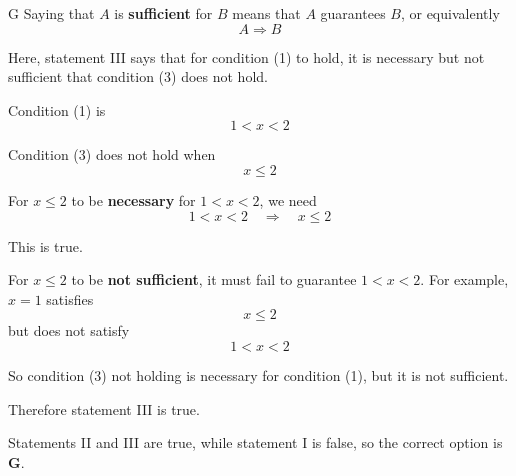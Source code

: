 \documentclass[11pt,a4paper]{article}
\begin{document}
\begin{enumerate}[label=\textbf{\arabic*.},leftmargin=*,itemsep=0pt,start=10]
\begin{djsSolution}{G}
Saying that \(A\) is \textbf{sufficient} for \(B\) means that \(A\) guarantees \(B\), or equivalently
\[
A\Longrightarrow B
\]

Here, statement III says that for condition (1) to hold, it is necessary but not sufficient that condition (3) does not hold.

Condition (1) is
\[
1<x<2
\]

Condition (3) does not hold when
\[
x\leq2
\]

For \(x\leq2\) to be \textbf{necessary} for \(1<x<2\), we need
\[
1<x<2
\quad\Longrightarrow\quad
x\leq2
\]

This is true.

For \(x\leq2\) to be \textbf{not sufficient}, it must fail to guarantee \(1<x<2\). For example, \(x=1\) satisfies
\[
x\leq2
\]
but does not satisfy
\[
1<x<2
\]

So condition (3) not holding is necessary for condition (1), but it is not sufficient.

Therefore statement III is true.

Statements II and III are true, while statement I is false, so the correct option is \textbf{G}.
\end{djsSolution}
\end{enumerate}
\clearpage
\thispagestyle{djssolutions}
\vspace*{8pt}
\end{document}
